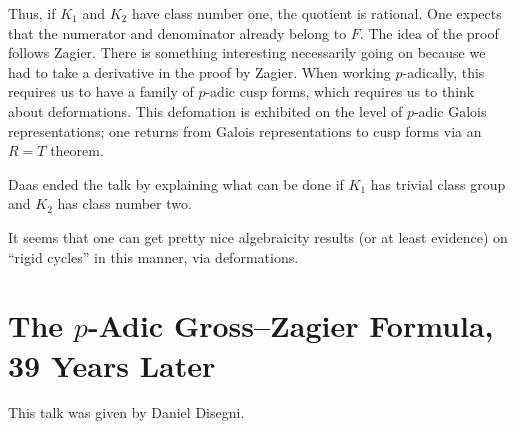 \documentclass{article}
\begin{document}
Thus, if $K_1$ and $K_2$ have class number one, the quotient is rational. One expects that the numerator and denominator already belong to $F$. The idea of the proof follows Zagier. There is something interesting necessarily going on because we had to take a derivative in the proof by Zagier. When working $p$-adically, this requires us to have a family of $p$-adic cusp forms, which requires us to think about deformations. This defomation is exhibited on the level of $p$-adic Galois representations; one returns from Galois representations to cusp forms via an $R=T$ theorem.
\begin{remark}
	Daas ended the talk by explaining what can be done if $K_1$ has trivial class group and $K_2$ has class number two.
\end{remark}
It seems that one can get pretty nice algebraicity results (or at least evidence) on ``rigid cycles'' in this manner, via deformations.

\section{The \texorpdfstring{$p$}{p}-Adic Gross--Zagier Formula, 39 Years Later}
This talk was given by Daniel Disegni.
\end{document}
